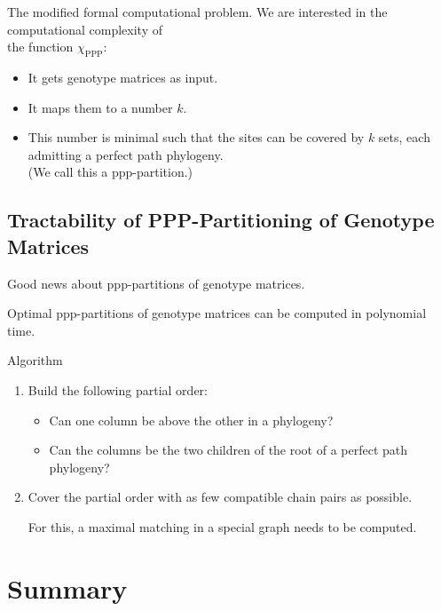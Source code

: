 \documentclass{beamer}
\begin{document}
\begin{frame}{The modified formal computational problem.}
	We are interested in the computational complexity of \\
	the function $\chi_{{\operatorname{PPP}}}$:
	\begin{itemize}
		\item It gets genotype matrices as input.
		\item It maps them to a number $k$.
		\item This number is minimal such that the sites can be
			covered by $k$ sets, each admitting a perfect \alert{path} phylogeny.
			\\
			(We call this a ppp-partition.)
	\end{itemize}
\end{frame}



\subsection{Tractability of PPP-Partitioning of Genotype Matrices}

\begin{frame}{Good news about ppp-partitions of genotype matrices.}
	\begin{theorem}
		\alert{Optimal ppp-partitions of genotype matrices} can be
		computed in \alert{polynomial time}. 
	\end{theorem}
	\begin{block}{Algorithm}
		\begin{enumerate}
			\item Build the following partial order:
				\begin{itemize}
					\item Can one column be above the other in a phylogeny?
					\item Can the columns be the two children of the root of a
						perfect path phylogeny?
				\end{itemize}
			\item Cover the partial order with as few compatible chain pairs 
				as possible. 

				For this, a maximal matching in a special graph needs to be
				computed.
		\end{enumerate}
	\end{block}
	\hyperlink{algorithm<1>}{}
	\hypertarget{return}{}
\end{frame}

\section*{Summary}
\end{document}
